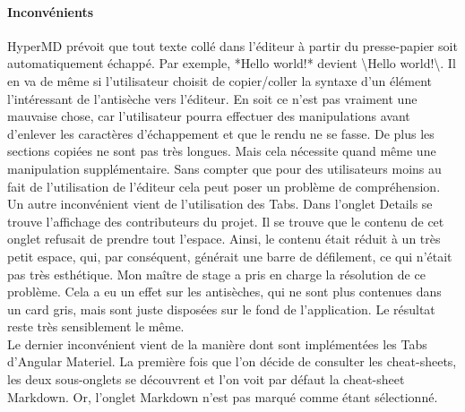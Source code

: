 \documentclass[12pt]{article}
\begin{document}
\paragraph{Inconvénients}
HyperMD prévoit que tout texte collé dans l'éditeur à partir du presse-papier soit automatiquement échappé. Par exemple, *Hello world!* devient \textbackslash*Hello world!\textbackslash*. Il en va de même si l'utilisateur choisit de copier/coller la syntaxe d'un élément l'intéressant de l'antisèche vers l'éditeur. En soit ce n'est pas vraiment une mauvaise chose, car l'utilisateur pourra effectuer des manipulations avant d'enlever les caractères d'échappement et que le rendu ne se fasse. De plus les sections copiées ne sont pas très longues. Mais cela nécessite quand même une manipulation supplémentaire. Sans compter que pour des utilisateurs moins au fait de l'utilisation de l'éditeur cela peut poser un problème de compréhension.\\
Un autre inconvénient vient de l'utilisation des Tabs. Dans l'onglet Details se trouve l'affichage des contributeurs du projet. Il se trouve que le contenu de cet onglet refusait de prendre tout l'espace. Ainsi, le contenu était réduit à un très petit espace, qui, par conséquent, générait une barre de défilement, ce qui n'était pas très esthétique. Mon maître de stage a pris en charge la résolution de ce problème. Cela a eu un effet sur les antisèches, qui ne sont plus contenues dans un card gris, mais sont juste disposées sur le fond de l'application. Le résultat reste très sensiblement le même.\\
Le dernier inconvénient vient de la manière dont sont implémentées les Tabs d'Angular Materiel. La première fois que l'on décide de consulter les cheat-sheets, les deux sous-onglets se découvrent et l'on voit par défaut la cheat-sheet Markdown. Or, l'onglet Markdown n'est pas marqué comme étant sélectionné.\\
\end{document}
